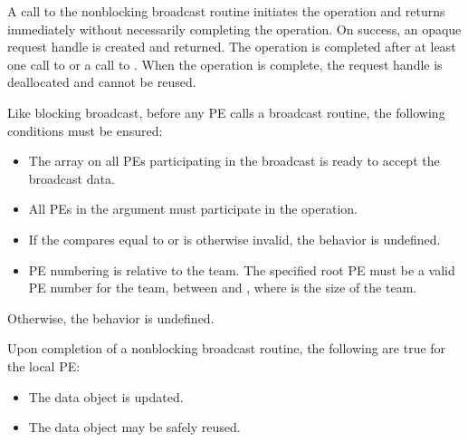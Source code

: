 \begin{apidefinition}
{    A call to the nonblocking broadcast routine initiates the operation and returns
    immediately without necessarily completing the operation. On success,
    an opaque request handle is created and returned. The
    operation is completed after at least one call to  or a
    call to . When the operation is complete, the request handle
    is deallocated and cannot be reused.

    Like blocking broadcast, before any \ac{PE} calls a broadcast routine, the following
    conditions must be ensured:
    \begin{itemize}
    \item The \dest{} array on all \acp{PE} participating in the broadcast
      is ready to accept the broadcast data.
    \item All \acp{PE} in the  argument must participate in
      the operation.
    \item If the  compares equal to  or is
      otherwise invalid, the behavior is undefined.
    \item \ac{PE} numbering is relative to the team. The specified
      root \ac{PE} must be a valid \ac{PE} number for the team,
      between  and , where  is the size of
      the team.
    \end{itemize}
    Otherwise, the behavior is undefined.

    Upon completion of a nonblocking broadcast routine, the following are true for the local
    \ac{PE}:
    \begin{itemize}
    \item The \dest{} data object is
      updated.
    \item The \source{} data object may be safely reused.
    \end{itemize}
}




\end{apidefinition}
